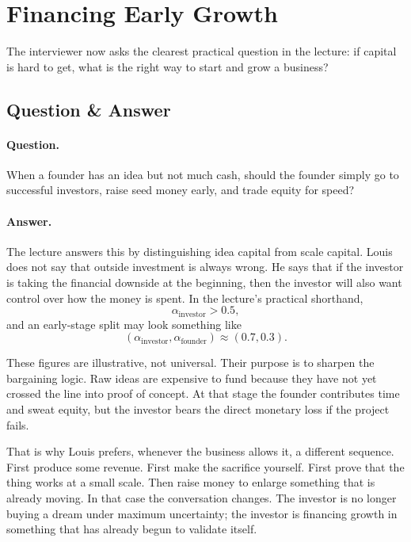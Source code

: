 \section{Financing Early Growth}

The interviewer now asks the clearest practical question in the lecture: if capital is hard to get, what is the right way to start and grow a business?

\subsection{Question \& Answer}

\paragraph{Question.}
When a founder has an idea but not much cash, should the founder simply go to successful investors, raise seed money early, and trade equity for speed?

\paragraph{Answer.}
The lecture answers this by distinguishing idea capital from scale capital. Louis does not say that outside investment is always wrong. He says that if the investor is taking the financial downside at the beginning, then the investor will also want control over how the money is spent. In the lecture's practical shorthand,
\begin{equation}
\alpha_{\mathrm{investor}} > 0.5,
\end{equation}
and an early-stage split may look something like
\begin{equation}
(\alpha_{\mathrm{investor}},\alpha_{\mathrm{founder}})\approx (0.7,0.3).
\end{equation}

These figures are illustrative, not universal. Their purpose is to sharpen the bargaining logic. Raw ideas are expensive to fund because they have not yet crossed the line into proof of concept. At that stage the founder contributes time and sweat equity, but the investor bears the direct monetary loss if the project fails.

That is why Louis prefers, whenever the business allows it, a different sequence. First produce some revenue. First make the sacrifice yourself. First prove that the thing works at a small scale. Then raise money to enlarge something that is already moving. In that case the conversation changes. The investor is no longer buying a dream under maximum uncertainty; the investor is financing growth in something that has already begun to validate itself.


